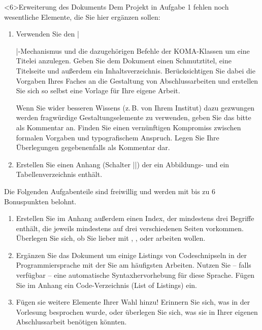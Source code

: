 \documentclass[
	vorläufig=false, 
	blattnr=7,
	ausgabe=2021-12-08,
	abgabe=2021-12-15,
	lösung=true,
	shortverb,
]{../tex/latexkurs-exercise}
\begin{document}
\begin{aufgabe}[6]<6>{Erweiterung des Dokuments}
Dem Projekt in Aufgabe 1 fehlen noch wesentliche Elemente, die Sie hier ergänzen sollen:
\begin{enumerate}[label=\alph*)]
\item Verwenden Sie den |\maketitle|-Mechanismus und die dazugehörigen Befehle der  KOMA-Klassen um eine Titelei anzulegen. Geben Sie dem Dokument einen Schmutztitel, eine Titelseite und außerdem ein Inhaltsverzeichnis. Berücksichtigen Sie dabei die Vorgaben Ihres Faches an die Gestaltung von Abschlussarbeiten und erstellen Sie sich so selbst eine Vorlage für Ihre eigene Arbeit.

Wenn Sie wider besseren Wissens (z.\,B. von Ihrem Institut) dazu gezwungen werden fragwürdige Gestaltungselemente zu verwenden, geben Sie das bitte als Kommentar an. Finden Sie einen vernünftigen Kompromiss zwischen formalen Vorgaben und typografischem Anspruch. Legen Sie Ihre Überlegungen gegebenenfalls als Kommentar dar.
\item Erstellen Sie einen Anhang (Schalter |\appendix|) der ein Abbildungs- und ein Tabellenverzeichnis enthält.
\end{enumerate}
Die Folgenden Aufgabenteile sind freiwillig und werden mit bis zu 6 Bonuspunkten belohnt.
\begin{enumerate}[resume,label=\alph*)]
\item Erstellen Sie im Anhang außerdem einen Index, der mindestens drei Begriffe enthält, die jeweils mindestens auf drei verschiedenen Seiten vorkommen. Überlegen Sie sich, ob Sie lieber mit , ,  oder  arbeiten wollen.
\item Ergänzen Sie das Dokument um einige Listings von Codeschnipseln in der Programmiersprache mit der Sie am häufigsten Arbeiten. Nutzen Sie – falls verfügbar – eine automatische Syntaxhervorhebung für diese Sprache. Fügen Sie im Anhang ein Code-Verzeichnis (List of Listings) ein.
\item Fügen sie weitere Elemente Ihrer Wahl hinzu! Erinnern Sie sich, was in der Vorlesung besprochen wurde, oder überlegen Sie sich, was sie in Ihrer eigenen Abschlussarbeit benötigen könnten.
\end{enumerate}
\end{aufgabe}
\end{document}
